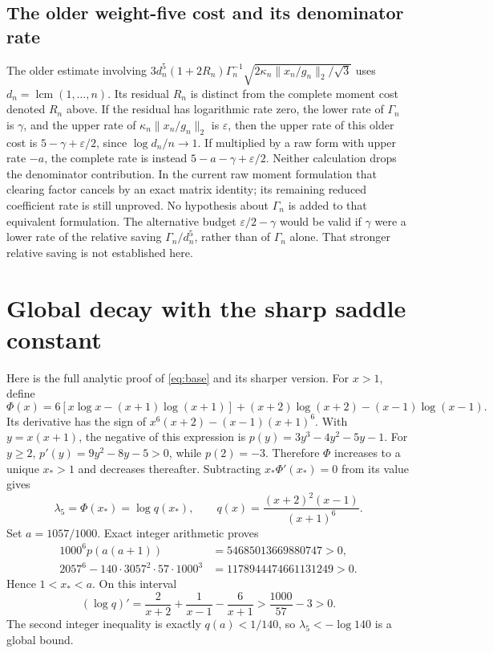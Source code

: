 \documentclass[11pt]{article}
\theoremstyle{remark}
\newcommand{\la}{\lambda}
\begin{document}
\subsection{The older weight-five cost and its denominator rate}
The older estimate involving
\(3d_n^5(1+2R_n)\Gamma_n^{-1}
\sqrt{2\kappa_n\|x_n/g_n\|_2/\sqrt3}\)
uses \(d_n=\operatorname{lcm}(1,\ldots,n)\). Its residual \(R_n\)
is distinct from the complete moment cost denoted \(R_n\) above.
If the residual has logarithmic rate zero, the lower rate of
\(\Gamma_n\) is \(\gamma\), and the upper rate of
\(\kappa_n\|x_n/g_n\|_2\) is \(\varepsilon\), then the upper
rate of this older cost is \(5-\gamma+\varepsilon/2\), since
\(\log d_n/n\to1\). If multiplied by a raw form with upper rate
\(-a\), the complete rate is instead
\(5-a-\gamma+\varepsilon/2\). Neither calculation drops the
denominator contribution. In the current raw moment formulation that
clearing factor cancels by an exact matrix identity; its remaining
reduced coefficient rate is still unproved. No hypothesis about
\(\Gamma_n\) is added to that equivalent formulation.
The alternative budget \(\varepsilon/2-\gamma\) would be valid if
\(\gamma\) were a lower rate of the relative saving
\(\Gamma_n/d_n^5\), rather than of \(\Gamma_n\) alone. That stronger
relative saving is not established here.

\appendix
\section{Global decay with the sharp saddle constant}
Here is the full analytic proof of \eqref{eq:base} and its sharper version.
For \(x>1\), define
\[
 \Phi(x)=6[x\log x-(x+1)\log(x+1)]
       +(x+2)\log(x+2)-(x-1)\log(x-1).
\]
Its derivative has the sign of
\(x^6(x+2)-(x-1)(x+1)^6\). With \(y=x(x+1)\), the negative of this
expression is \(p(y)=3y^3-4y^2-5y-1\).
For \(y\ge2\), \(p'(y)=9y^2-8y-5>0\), while \(p(2)=-3\).
Therefore \(\Phi\) increases to a unique \(x_*>1\) and decreases thereafter.
Subtracting \(x_*\Phi'(x_*)=0\) from its value gives
\[
 \la_5=\Phi(x_*)=\log q(x_*),\qquad
 q(x)=\frac{(x+2)^2(x-1)}{(x+1)^6}.
\]
Set \(a=1057/1000\). Exact integer arithmetic proves
\begin{align*}
 1000^6p(a(a+1))&=54685013669880747>0,\\
 2057^6-140\cdot3057^2\cdot57\cdot1000^3
       &=1178944474661131249>0.
\end{align*}
Hence \(1<x_*<a\). On this interval
\[
 (\log q)'=\frac2{x+2}+\frac1{x-1}-\frac6{x+1}
           >\frac{1000}{57}-3>0.
\]
The second integer inequality is exactly \(q(a)<1/140\), so
\(\la_5<-\log140\) is a global bound.
\end{document}
